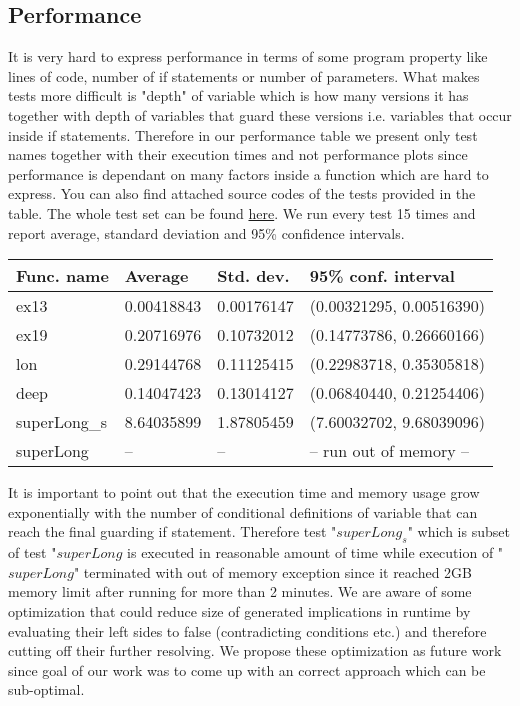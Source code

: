 \documentclass[letterpaper,12pt]{article}
\begin{document}
\subsection{Performance}
It is very hard to express performance in terms of some program property like lines of code, number of if statements or number of parameters. What makes tests more difficult is "depth" of variable which is how many versions it has together with depth of variables that guard these versions i.e. variables that occur inside if statements. Therefore in our performance table we present only test names together with their execution times and not performance plots since performance is dependant on many factors inside a function which are hard to express. You can also find attached source codes of the tests provided in the table. The whole test set can be found \href{https://github.com/limo1996/Puppy/blob/master/test/1/Test.java}{here}. We run every test 15 times and report average, standard deviation and 95\% confidence intervals.

\begin{center}
    \begin{tabular}{ | l | l | l | p{5cm} |}
    \hline
    Func. name & Average & Std. dev. & 95\% conf. interval \\ \hline
    ex13 & 0.00418843 & 0.00176147 & (0.00321295, 0.00516390) \\ \hline
    ex19 & 0.20716976 & 0.10732012 & (0.14773786, 0.26660166) \\ \hline
    lon & 0.29144768 & 0.11125415 & (0.22983718, 0.35305818) \\ \hline
    deep & 0.14047423 & 0.13014127 & (0.06840440, 0.21254406) \\ \hline
    superLong_s & 8.64035899 & 1.87805459 & (7.60032702, 9.68039096) \\ \hline
    superLong & -- & -- & -- run out of memory -- \\ \hline
    \hline
    \end{tabular}
\end{center}

It is important to point out that the execution time and memory usage grow exponentially with the number of conditional definitions of variable that can reach the final guarding if statement. Therefore test "$superLong_s$" which is subset of test "$superLong$ is executed in reasonable amount of time while execution of "$superLong$" terminated with out of memory exception since it reached 2GB memory limit after running for more than 2 minutes. We are aware of some optimization that could reduce size of generated implications in runtime by evaluating their left sides to false (contradicting conditions etc.) and therefore cutting off their further resolving. We propose these optimization as future work since goal of our work was to come up with an correct approach which can be sub-optimal. 
\end{document}
